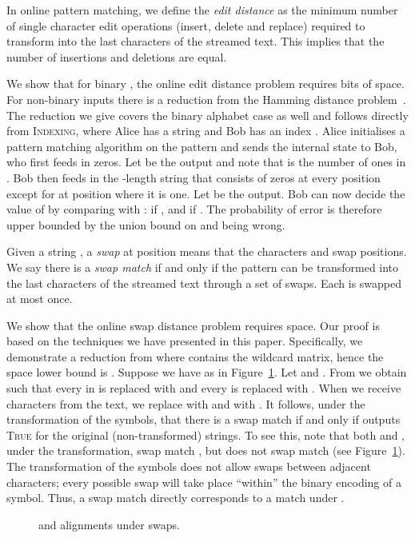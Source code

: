 \documentclass{article}
\newcommand{\TRUE}{\textsc{True}\xspace}
\newcommand{\indexing}{\textsc{Indexing}\xspace}
\theoremstyle{plain}
\theoremstyle{definition}
\begin{document}
In online pattern matching, we define the \emph{edit distance}  as the minimum number of single character edit operations (insert, delete and replace) required to transform  into the last  characters of the streamed text. This implies that the number of insertions and deletions are equal.

We show that for binary , the online edit distance problem requires  bits of space. For non-binary inputs there is a reduction from the Hamming distance problem~\cite{ApproxEdit:04}. The reduction we give covers the binary alphabet case as well and follows directly from \indexing, where Alice has a string  and Bob has an index . Alice initialises a pattern matching algorithm on the pattern  and sends the internal state to Bob, who first feeds in  zeros. Let  be the output and note that  is the number of ones in . Bob then feeds in the -length string that consists of zeros at every position except for at position  where it is one. Let  be the output. Bob can now decide the value of  by comparing  with :  if , and  if . The probability of error is therefore upper bounded by the union bound on  and  being wrong.

Given a string , a \emph{swap} at position  means that the characters  and  swap positions. We say there is a \emph{swap match} if and only if the pattern  can be transformed into the last  characters of the streamed text through a set of swaps. Each  is swapped at most once.

We show that the online swap distance problem requires  space. Our proof is based on the techniques we have presented in this paper.  Specifically, we demonstrate a reduction from  where  contains the wildcard matrix, hence the space lower bound is . Suppose we have  as in Figure~\ref{fig:swap}. Let  and . From  we obtain  such that every  in  is replaced with  and every  is replaced with . When we receive characters from the text, we replace  with  and  with . It follows, under the transformation of the symbols, that there is a swap match if and only if  outputs \TRUE for the original (non-transformed) strings. To see this, note that both  and , under the transformation, swap match , but  does not swap match  (see Figure~\ref{fig:swap}). The transformation of the symbols does not allow swaps between adjacent characters; every possible swap will take place ``within'' the binary encoding of a symbol. Thus, a swap match directly corresponds to a match under .
\begin{figure}[t]
    
    \caption{\label{fig:swap} and alignments under swaps.}
\end{figure}
\end{document}
